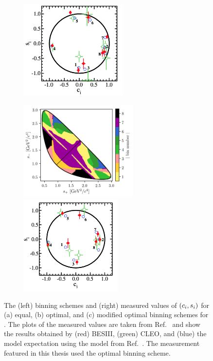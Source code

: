 \begin{figure}[p]
\begin{subfigure}{\columnwidth}
        \includegraphics[height=5cm]{figures/theory/cisi_optimal.png}
        \caption{}
        \label{fig:kspipi_bins_opt}
    \end{subfigure}
    \begin{subfigure}{\columnwidth}
        \centering
        \includegraphics[height=5cm]{figures/theory/binnings/KsPiPi_mod_optimal.png}
        \includegraphics[height=5cm]{figures/theory/cisi_modified_optimal.png}
        \caption{}
        \label{fig:kspipi_bins_modopt}
    \end{subfigure}
    \caption{The (left) binning schemes and (right) measured values of $(c_i,s_i)$ for (a) equal, (b) optimal, and (c) modified optimal binning schemes for \DtoKspipi. The plots of the measured values are taken from Ref.~\cite{BESCISI} and show the results obtained by (red) BESIII, (green) CLEO, and (blue) the model expectation using the model from Ref.~\cite{Belle2018}.
    The measurement featured in this thesis used the optimal binning scheme.}
    \label{fig:kspipi_bins}
\end{figure}

